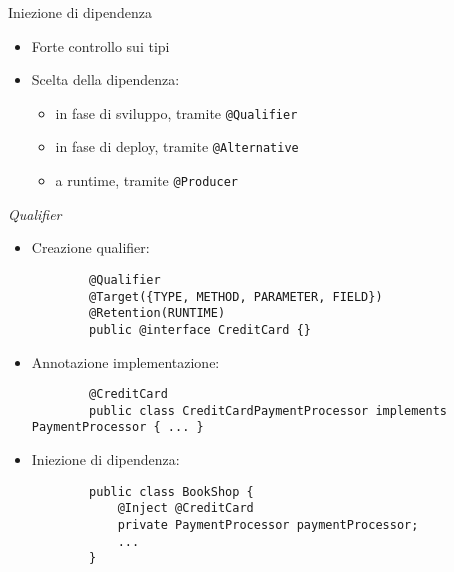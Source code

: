\begin{frame}{Iniezione di dipendenza}

\begin{itemize}
\item Forte controllo sui tipi

\vspace{1em}

\item Scelta della dipendenza:

	\begin{itemize}
	
	\vspace{0.5em}
	
	\item in fase di sviluppo, tramite \texttt{@Qualifier}
	
	\vspace{0.8em}
	
	\item in fase di deploy, tramite \texttt{@Alternative}
	
	\vspace{0.8em}
	
	\item a runtime, tramite \texttt{@Producer}
	
	\end{itemize}

\end{itemize}

\end{frame}



\begin{frame}[fragile]{\textsl{Qualifier}}


\begin{itemize}
\item Creazione qualifier:
	\begin{lstlisting}
		@Qualifier
		@Target({TYPE, METHOD, PARAMETER, FIELD})
		@Retention(RUNTIME)
		public @interface CreditCard {}
	\end{lstlisting}
\end{itemize}



\begin{itemize}
\item Annotazione implementazione:
	\begin{lstlisting}
		@CreditCard
		public class CreditCardPaymentProcessor implements PaymentProcessor { ... }
	\end{lstlisting}

\item Iniezione di dipendenza:
	\begin{lstlisting}
		public class BookShop {
		    @Inject @CreditCard 
		    private PaymentProcessor paymentProcessor;
		    ...
		}
	\end{lstlisting}

\end{itemize}
\end{frame}





